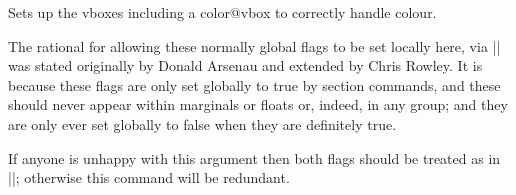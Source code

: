  \begin{macro}{\@savemarbox}
 Sets up the vboxes including a color@vbox to correctly handle colour. 
    \begin{teX}
\long{}
    \end{teX}
  \end{macro}
 

 
\begin{macro}{\@marginparreset}
%
 The rational for allowing these normally global flags to be set
 locally here, via |\@parboxrestore| was stated originally by
 Donald Arsenau and extended by Chris Rowley.
 It is because these flags are only set globally to
 true by section commands, and these should never appear within
 marginals or floats or, indeed, in any group; and they are only ever
 set globally to false when they are definitely true.

 If anyone is unhappy with this argument then both flags should be
 treated as in |\set@nobreak|; otherwise this command will be
 redundant. 
    \begin{teX}
\def \@marginparreset {%
        \reset@font
        \normalsize
        \@setminipage
}
    \end{teX}
\end{macro}
%
 \begin{macro}{\@xympar}
%
\begin{teX}
\def \@xympar{%
  \ifnum\@floatpenalty <\z@\@cons\@currlist\@marbox\fi
  \setbox\@tempboxa
    \color@vbox
      \vbox \bgroup
  \end@float
  \@ignorefalse
  \@esphack
}
    \end{teX}
 \end{macro}

 
%
 \begin{macro}{\reversemarginpar}
 \begin{macro}{\normalmarginpar}
    \begin{teX}
\def\reversemarginpar{\global\@mparbottom\z@ \@reversemargintrue}
\def\normalmarginpar{\global\@mparbottom\z@ \@reversemarginfalse}
    \end{teX}
 \end{macro}
 \end{macro}

